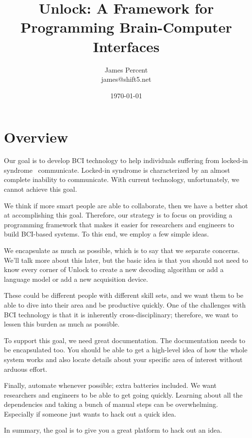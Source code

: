 \documentclass[11pt]{article}
\begin{document}
\title{\textbf{Unlock: A Framework for Programming Brain-Computer Interfaces}}
\author{James Percent \\
james@shift5.net}
\date{\today}
\parskip 11pt
\parindent 0pt
\maketitle
\tableofcontents
\section{Overview}\label{overviewsec}

Our goal is to develop BCI technology to help individuals suffering from locked-in syndrome~\cite{lis} communicate.  Locked-in syndrome is characterized by an almost complete inability to communicate.  With current technology, unfortunately, we cannot achieve this goal.

We think if more smart people are able to collaborate, then we have a better shot at accomplishing this goal.  Therefore, our strategy is to focus on providing a programming framework that makes it easier for researchers and engineers to build BCI-based systems.  To this end, we employ a few simple ideas.  

We encapsulate as much as possible, which is to say that we separate concerns.  We'll talk more about this later, but the basic idea is that you should not need to know every corner of Unlock to create a new decoding algorithm or add a language model or add a new acquisition device.  

These could be different people with different skill sets, and we want them to be able to dive into their area and be productive quickly.  One of the challenges with BCI technology is that it is inherently cross-disciplinary; therefore, we want to lessen this burden as much as possible.

To support this goal, we need great documentation.  The documentation needs to be encapsulated too.  You should be able to get a high-level idea of how the whole system works and also locate details about your specific area of interest without arduous effort.  

Finally, automate whenever possible; extra batteries included.  We want researchers and engineers to be able to get going quickly.  Learning about all the dependencies and taking a bunch of manual steps can be overwhelming.  Especially if someone just wants to hack out a quick idea.  

In summary, the goal is to give you a great platform to hack out an idea.
\end{document}
